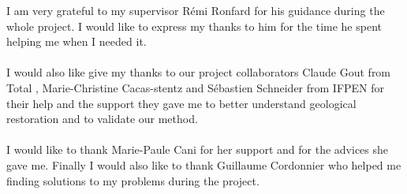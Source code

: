 \documentclass[12pt, a4paper]{report} %
\begin{document}
I am very grateful to my supervisor R\'emi Ronfard for his guidance during the whole project. I would like to express my thanks to him for the time he spent helping me when I needed it.
\\\\
I would also like give my thanks to our project collaborators Claude Gout from Total , Marie-Christine Cacas-stentz and S\'ebastien Schneider from IFPEN for their help and the support they gave me to better understand geological restoration and to validate our method. 
\\\\
I would like to thank Marie-Paule Cani for her support and for the advices she gave me. Finally I would also like to thank Guillaume Cordonnier who helped me finding solutions to my problems during the project.
\newpage
\tableofcontents
\end{document}
